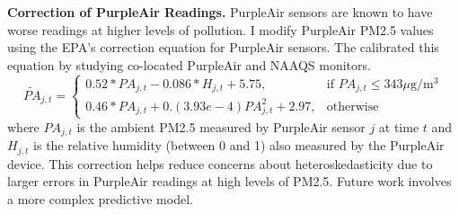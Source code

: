 \documentclass[12pt]{article}
\begin{document}
\textbf{Correction of PurpleAir Readings.} PurpleAir sensors are known to have worse readings at higher levels of pollution. I modify PurpleAir PM2.5 values using the EPA's correction equation for PurpleAir sensors. The calibrated this equation by studying co-located PurpleAir and NAAQS monitors.
$$
\widetilde{PA}_{j,t}=\begin{cases}
			0.52*PA_{j,t} - 0.086*H_{j,t} + 5.75, & \text{if $PA_{j,t} \leq 343 \mu$g/m$^3$}\\
            0.46*PA_{j,t} + 0.(3.93e-4)PA_{j,t}^2 + 2.97, & \text{otherwise}
		 \end{cases}
$$
where $PA_{j,t}$ is the ambient PM2.5 measured by PurpleAir sensor $j$ at time $t$ and $H_{j,t}$ is the relative humidity (between 0 and 1) also measured by the PurpleAir device. This correction helps reduce concerns about heteroskedasticity due to larger errors in PurpleAir readings at high levels of PM2.5. Future work involves a more complex predictive model.


\end{document}
